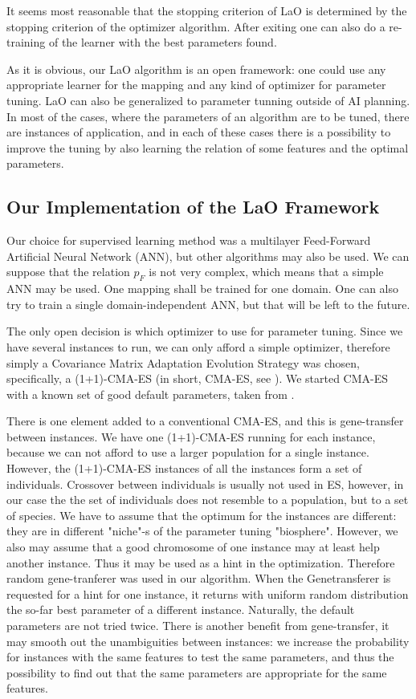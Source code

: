 \documentclass{acm_proc_article-sp}
\begin{document}
It seems most reasonable that the stopping criterion of LaO is determined by the stopping criterion of the optimizer algorithm. After exiting one can also do a re-training of the learner with the best parameters found.

As it is obvious, our LaO algorithm is an open framework: one could use any appropriate learner for the mapping and any kind of optimizer for parameter tuning. LaO can also be generalized to parameter tunning outside of AI planning. In most of the cases, where the parameters of an algorithm are to be tuned, there are instances of application, and in each of these cases there is a possibility to improve the tuning by also learning the relation of some features and the optimal parameters.

\subsection{Our Implementation of the LaO Framework}

Our choice for supervised learning method was a multilayer Feed-Forward Artificial Neural Network (ANN), but other algorithms may also be used. We can suppose that the relation \begin{math}p_F\end{math} is not very complex, which means that a simple ANN may be used. One mapping shall be trained for one domain. One can also try to train a single domain-independent ANN, but that will be left to the future.

The only open decision is which optimizer to use for parameter tuning. Since we have several instances to run, we can only afford a simple optimizer, therefore simply a Covariance Matrix Adaptation Evolution Strategy was chosen, specifically, a (1+1)-CMA-ES (in short, CMA-ES, see \cite{hansen2001ecj}). We started CMA-ES with a known set of good default parameters, taken from \cite{BibGECCO:2010}.

There is one element added to a conventional CMA-ES, and this is gene-transfer between instances. We have one (1+1)-CMA-ES running for each instance, because we can not afford to use a larger population for a single instance. However, the (1+1)-CMA-ES instances of all the instances form a set of individuals. Crossover between individuals is usually not used in ES, however, in our case the the set of individuals does not resemble to a population, but to a set of species. We have to assume that the optimum for the instances are different: they are in different "niche"-s of the parameter tuning "biosphere". However, we also may assume that a good chromosome of one instance may at least help another instance. Thus it may be used as a hint in the optimization. Therefore random gene-tranferer was used in our algorithm. When the Genetransferer is requested for a hint for one instance, it returns with uniform random distribution the so-far best parameter of a different instance. Naturally, the default parameters are not tried twice. There is another benefit from gene-transfer, it may smooth out the unambiguities between instances: we increase the probability for instances with the same features to test the same parameters, and thus the possibility to find out that the same parameters are appropriate for the same features.
\end{document}
